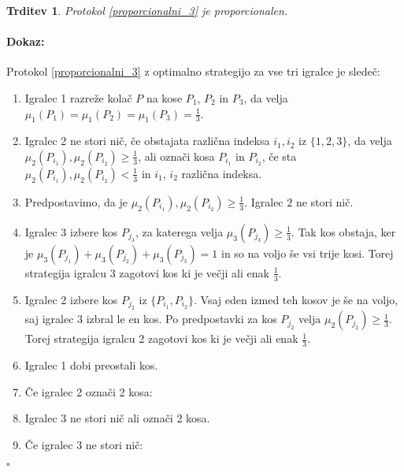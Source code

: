 \documentclass[a4paper, 12pt]{article}
\newtheorem{trditev}{Trditev}
\newenvironment{dokaz}{\paragraph{Dokaz:}}{\hfill$\square$\\}
\begin{document}
	\begin{trditev}
		Protokol \ref{proporcionalni_3} je proporcionalen.
	\end{trditev}

	\begin{dokaz}
		Protokol \ref{proporcionalni_3} z optimalno strategijo za vse tri igralce je sledeč:
		\begin{enumerate}
			
			\item Igralec 1 razreže kolač $P$ na kose $P_1$, $P_2$ in $P_3$, da velja $\mu_1 (P_1) = \mu_1 (P_2) = \mu_1 (P_3) = \frac{1}{3}$.
			
			\item Igralec 2 ne stori nič, če obstajata različna indeksa $i_1, i_2$ iz $\{1, 2, 3\}$, da velja $\mu_2 (P_{i_1}), \mu_2 (P_{i_2}) \geq \frac{1}{3}$, ali označi kosa $P_{i_1}$ in $P_{i_2}$, če sta $\mu_2 (P_{i_1}), \mu_2 (P_{i_2}) < \frac{1}{3}$ in $i_1$, $i_2$ različna indeksa.
			
			\item[] Predpostavimo, da je $\mu_2 (P_{i_1}), \mu_2 (P_{i_2}) \geq \frac{1}{3}$. Igralec 2 ne stori nič.
			
			\setcounter{enumi}{2}
			
			\item \qquad Igralec 3 izbere kos $P_{j_3}$, za katerega velja $\mu_3 (P_{j_3}) \geq \frac{1}{3}$. Tak kos obstaja, ker je $\mu_3 (P_{j_1}) + \mu_3 (P_{j_2}) + \mu_3 (P_{j_3}) = 1$ in so na voljo še vsi trije kosi. Torej strategija igralcu 3 zagotovi kos ki je večji ali enak $\frac{1}{3}$.
			
			\item \qquad Igralec 2 izbere kos $P_{j_2}$ iz $\{P_{i_1}, P_{i_2}\}$. Vsaj eden izmed teh kosov je še na voljo, saj igralec 3 izbral le en kos. Po predpostavki za kos $P_{j_2}$ velja $\mu_2 (P_{j_2}) \geq \frac{1}{3}$. Torej strategija igralcu 2 zagotovi kos ki je večji ali enak $\frac{1}{3}$.
			
			\item \qquad Igralec 1 dobi preostali kos.
			
			\item[] Če igralec 2 označi 2 kosa:
			
			\setcounter{enumi}{2}
			
			\item \qquad Igralec 3 ne stori nič ali označi 2 kosa.
			
			\item[] \qquad Če igralec 3 ne stori nič:
			

\end{enumerate}
\end{dokaz}
\end{document}
